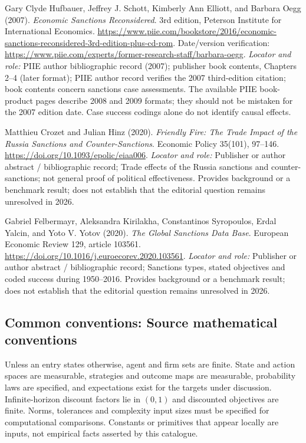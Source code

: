 \documentclass[11pt,a4paper]{article}
\begin{document}
\begin{enumerate}[label={[S\arabic*]},leftmargin=*]

\item Gary Clyde Hufbauer, Jeffrey J. Schott, Kimberly Ann Elliott, and Barbara Oegg (2007). \emph{Economic Sanctions Reconsidered}. 3rd edition, Peterson Institute for International Economics. \url{https://www.piie.com/bookstore/2016/economic-sanctions-reconsidered-3rd-edition-plus-cd-rom}. Date/version verification: \url{https://www.piie.com/experts/former-research-staff/barbara-oegg}.
\textit{Locator and role:} PIIE author bibliographic record (2007); publisher book contents, Chapters 2–4 (later format); PIIE author record verifies the 2007 third-edition citation; book contents concern sanctions case assessments. The available PIIE book-product pages describe 2008 and 2009 formats; they should not be mistaken for the 2007 edition date. Case success codings alone do not identify causal effects.

\item Matthieu Crozet and Julian Hinz (2020). \emph{Friendly Fire: The Trade Impact of the Russia Sanctions and Counter-Sanctions}. Economic Policy 35(101), 97–146. \url{https://doi.org/10.1093/epolic/eiaa006}.
\textit{Locator and role:} Publisher or author abstract / bibliographic record; Trade effects of the Russia sanctions and counter-sanctions; not general proof of political effectiveness. Provides background or a benchmark result; does not establish that the editorial question remains unresolved in 2026.

\item Gabriel Felbermayr, Aleksandra Kirilakha, Constantinos Syropoulos, Erdal Yalcin, and Yoto V. Yotov (2020). \emph{The Global Sanctions Data Base}. European Economic Review 129, article 103561. \url{https://doi.org/10.1016/j.euroecorev.2020.103561}.
\textit{Locator and role:} Publisher or author abstract / bibliographic record; Sanctions types, stated objectives and coded success during 1950–2016. Provides background or a benchmark result; does not establish that the editorial question remains unresolved in 2026.

\end{enumerate}

\subsection*{Common conventions: Source mathematical conventions}

Unless an entry states otherwise, agent and firm sets are finite. State and action spaces are measurable, strategies and outcome maps are measurable, probability laws are specified, and expectations exist for the targets under discussion. Infinite-horizon discount factors lie in $(0,1)$ and discounted objectives are finite. Norms, tolerances and complexity input sizes must be specified for computational comparisons. Constants or primitives that appear locally are inputs, not empirical facts asserted by this catalogue.
\end{document}
